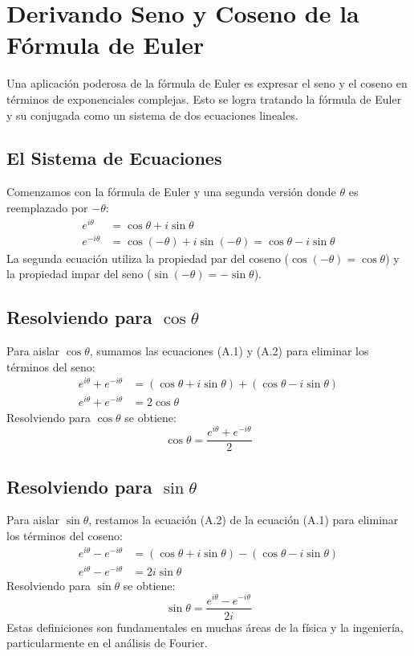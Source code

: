 \documentclass[11pt,a4paper]{article}
\begin{document}
\section{Derivando Seno y Coseno de la Fórmula de Euler}
Una aplicación poderosa de la fórmula de Euler es expresar el seno y el coseno en términos de exponenciales complejas. Esto se logra tratando la fórmula de Euler y su conjugada como un sistema de dos ecuaciones lineales.

\subsection{El Sistema de Ecuaciones}
Comenzamos con la fórmula de Euler y una segunda versión donde $\theta$ es reemplazado por $-\theta$:
\begin{align*}
    e^{i\theta} &= \cos\theta + i\sin\theta \tag{A.1} \\
    e^{-i\theta} &= \cos(-\theta) + i\sin(-\theta) = \cos\theta - i\sin\theta \tag{A.2}
\end{align*}
La segunda ecuación utiliza la propiedad par del coseno ($\cos(-\theta)=\cos\theta$) y la propiedad impar del seno ($\sin(-\theta)=-\sin\theta$).

\subsection{Resolviendo para \texorpdfstring{$\cos\theta$}{cos(theta)}}
Para aislar $\cos\theta$, sumamos las ecuaciones (A.1) y (A.2) para eliminar los términos del seno:
\begin{align*}
    e^{i\theta} + e^{-i\theta} &= (\cos\theta + i\sin\theta) + (\cos\theta - i\sin\theta) \\
    e^{i\theta} + e^{-i\theta} &= 2\cos\theta
\end{align*}
Resolviendo para $\cos\theta$ se obtiene:
\[ \boxed{\cos\theta = \frac{e^{i\theta} + e^{-i\theta}}{2}} \]

\subsection{Resolviendo para \texorpdfstring{$\sin\theta$}{sin(theta)}}
Para aislar $\sin\theta$, restamos la ecuación (A.2) de la ecuación (A.1) para eliminar los términos del coseno:
\begin{align*}
    e^{i\theta} - e^{-i\theta} &= (\cos\theta + i\sin\theta) - (\cos\theta - i\sin\theta) \\
    e^{i\theta} - e^{-i\theta} &= 2i\sin\theta
\end{align*}
Resolviendo para $\sin\theta$ se obtiene:
\[ \boxed{\sin\theta = \frac{e^{i\theta} - e^{-i\theta}}{2i}} \]
Estas definiciones son fundamentales en muchas áreas de la física y la ingeniería, particularmente en el análisis de Fourier.
\end{document}
